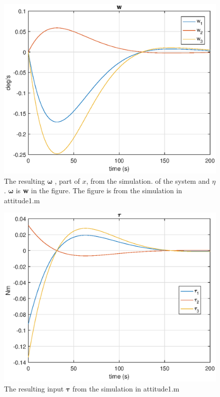 \begin{figure}[!h]
	\centering
	\includegraphics[width=1.00\textwidth]{figures/1_q.eps}
	\caption{ The resulting $ \boldsymbol{\omega}$ , part of $x$, from the simulation.  of the system and $\eta$. $\boldsymbol{\omega}$ is \textbf{w} in the figure. The figure is from the simulation in {\color{blue}attitude1.m}}
\label{fig:sim_attitude1_q}
\end{figure}

\begin{figure}[!h]
	\centering
	\includegraphics[width=1.00\textwidth]{figures/1_tau.eps}
	\caption{The resulting input $\boldsymbol{\tau}$ from the simulation in {\color{blue}attitude1.m}}
\label{fig:sim_attitude1_tau}
\end{figure}

